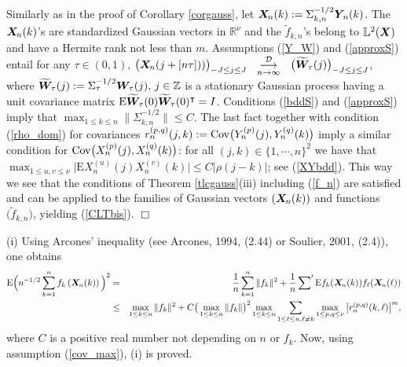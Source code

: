 \documentclass[10pt]{article}
\def\L{\mathbb{L}}
\def\R{\mathbb{R}}
\def\Z{\mathbb{Z}}
\def\E{\mathrm E}
\newcommand{\mbf}[1]{\mbox{\boldmath $#1$}}
\def\limiteloin{\renewcommand{\arraystretch}{0.5}
\begin{array}[t]{c}
\stackrel{{\cal D}}{\longrightarrow} \\
{\scriptstyle n \rightarrow\infty}
\end{array}\renewcommand{\arraystretch}{1}}
\def\limiten{\renewcommand{\arraystretch}{0.5}
\begin{array}[t]{c}
\stackrel{}{\longrightarrow} \\
{\scriptstyle n\rightarrow\infty}
\end{array}\renewcommand{\arraystretch}{1}}
\begin{document}
 Similarly as in the proof of Corollary \ref{corgauss},
let ${\mbf X}_{\! n}(k) :=  \Sigma^{-1/2}_{k,n} {\mbf Y}_{\! n}(k)$. %
The  ${\mbf X}_{\! n}(k)$'s are standardized Gaussian vectors in $\R^\nu$ and the $\tilde f_{k,n}$'s belong to $\L^2({\mbf X})$ and have
a Hermite rank not less than $m$.
Assumptions
(\ref{Y_W}) and (\ref{approxS}) entail for any $\tau \in (0,1)$, $\big({\mbf X}_{\! n}(j + [n\tau]))
\big)_{-J \le j \le J}$
$\limiteloin $  $ \big(\widetilde {\mbf W}_{\! \tau}(j)\big)_{-J \le j \le J}$, where
$\widetilde {\mbf W}_{\! \tau}(j)
 := \Sigma^{-1/2}_\tau {\mbf W}_{\! \tau}(j),  \, j\in {\Z}$ is a
stationary Gaussian process having a unit covariance matrix $\E \widetilde {\mbf W}_{\! \tau}(0) \widetilde {\mbf W}_{\! \tau}(0)^\intercal = I$.
Conditions (\ref{bddS}) and (\ref{approxS})  imply that $\max_{1\le k \le n} \|\Sigma_{k,n}^{-1/2}\| \le C$.
The last fact together with condition (\ref{rho_dom}) for covariances $r^{(p,q)}_n(j,k) :=  {\rm Cov}\big(Y^{(p)}_n(j), Y^{(q)}_n(k)\big) $
imply a similar condition for ${\rm Cov}\big(X^{(p)}_n(j), X^{(q)}_n(k)\big)$:
for all $(j, k)\in \{1,\cdots,n\}^2$ we have that
$\max_{1\le u, v \le \nu} \big|
\E X^{(u)}_{\! n}(j) X^{(v)}_{\! n}(k) \big| \le C|\rho(j-k)|$; see (\ref{XYbdd}).
This way we see that the conditions of Theorem \ref{tlcgauss}(iii) including (\ref{f_n})
are satisfied and can be applied to the families of Gaussian vectors
$({\mbf X}_{\! n}(k))$ and functions $\big (\tilde f_{k,n}\big )$, yielding (\ref{CLTbis}).  \hfill $\Box$ \\




\medskip


 (i) Using Arcones' inequality (see Arcones, 1994, (2.44) or Soulier, 2001, (2.4)), one obtains
\begin{eqnarray*}
\E \Big(n^{-1/2} \sum_{k=1}^n f_k\left({\mbf X}_{\! n}(k)\right)
\Big)^2 & =& \frac 1 n \sum_{k=1}^n \|f_k\|^2 + \frac 1 n
\sum\nolimits^\prime \E f_k({\mbf X}_{\! n}(k))f_\ell({\mbf X}_{\!
n}(\ell)) \\
& \leq & \max_{1\leq k \leq n} \|f_k\|^2 +C \big (\max_{1\leq k
\leq n} \|f_k\|\big )^2 \max_{1\leq k \leq n} \sum_{1\le \ell \le
n, \ell\neq k} \max_{1\le p, q\le \nu} \big
|r^{(p,q)}_n(k,\ell)\big |^m,
\end{eqnarray*}
where $C$ is a
positive real number not depending on $n$ or $f_k$. Now, using
assumption (\ref{cov_max}), (i) is proved.
\medskip
\end{document}
